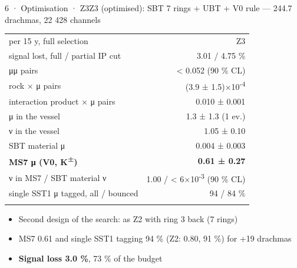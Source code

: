 \begin{btframe}{6 · Optimisation · Z3}{Z3 (optimised): SBT 7 rings + UBT + V0 rule — 244.7 drachmas, 22 428 channels}
{\par}
\vspace{2.46pt}
\noindent \begin{minipage}[c]{0.5\linewidth}
{\fontsize{5.31pt}{6.90pt}\selectfont\setlength{\tabcolsep}{3.72pt}\renewcommand{\arraystretch}{1.42}
\begin{tabular}{lr}
\textcolor{muted}{per 15 y, full selection} & \textcolor{muted}{Z3} \\\headrule
signal lost, full / partial IP cut & 3.01 / 4.75 \% \\\rowrule
μμ pairs & < 0.052 (90 \% CL) \\\rowrule
rock × μ pairs & (3.9 ± 1.5)×10\textsuperscript{-4} \\\rowrule
interaction product × μ pairs & 0.010 ± 0.001 \\\rowrule
μ in the vessel & 1.3 ± 1.3 (1 ev.) \\\rowrule
ν in the vessel & 1.05 ± 0.10 \\\rowrule
SBT material μ & 0.004 ± 0.003 \\\rowrule
\rowcolor{tint}\bfseries MS7 μ (V0, K\textsuperscript{±}) & \bfseries 0.61 ± 0.27 \\\rowrule
ν in MS7 / SBT material ν & 1.00 / < 6×10\textsuperscript{-3} (90 \% CL) \\\rowrule
single SST1 μ tagged, all / bounced & 94 / 84 \% \\\rowrule
\end{tabular}\par}
\end{minipage}%
\hfill%
\begin{minipage}[c]{0.5\linewidth}
{\fontsize{6.15pt}{8.60pt}\selectfont
\begin{itemize}
  \item Second design of the search: as Z2 with ring 3 back (7 rings)
  \item MS7 0.61 and single SST1 tagging 94 \% (Z2: 0.80, 91 \%) for +19 drachmas
  \item \textbf{Signal loss 3.0 \%}, 73 \% of the budget
\end{itemize}}

\end{minipage}
\end{btframe}
